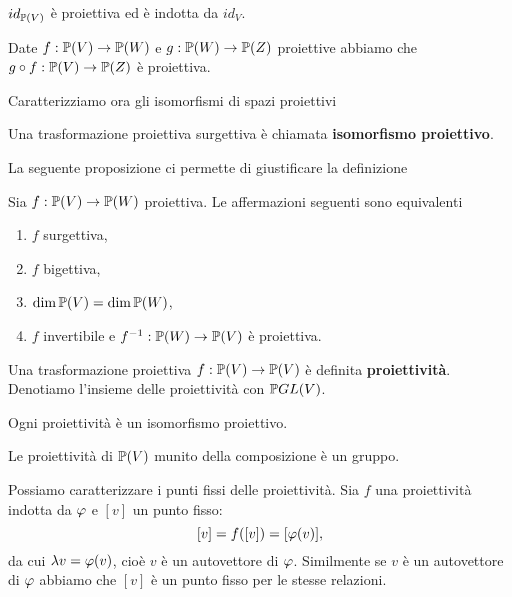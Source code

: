 \begin{multicols*}{2}
    \begin{remark}
        $id_{\mathbb{P}(V)}$ \`e proiettiva ed \`e indotta da $id_V$.
    \end{remark}
    \begin{proposition}
        Date $f:{\mathbb{P}(V)}\to{\mathbb{P}(W)}$ e $g:{\mathbb{P}(W)}\to\mathbb{P}(Z)$ proiettive abbiamo che $g\circ f:{\mathbb{P}(V)}\to\mathbb{P}(Z)$ \`e proiettiva.
    \end{proposition}

    \noindent Caratterizziamo ora gli isomorfismi di spazi proiettivi
    \begin{definition}
    Una trasformazione proiettiva surgettiva \`e chiamata \textbf{isomorfismo proiettivo}.
    \end{definition}
    La seguente proposizione ci permette di giustificare la definizione
    \begin{proposition}
    Sia $f:{\mathbb{P}(V)}\to{\mathbb{P}(W)}$ proiettiva. Le affermazioni seguenti sono equivalenti
    \begin{enumerate}
    \item $f$ surgettiva,
    \item $f$ bigettiva,
    \item $\dim{\mathbb{P}(V)}=\dim{\mathbb{P}(W)}$,
    \item $f$ invertibile e $f^{-1}:{\mathbb{P}(W)}\to{\mathbb{P}(V)}$ \`e proiettiva.
    \end{enumerate}
    \end{proposition}

    \begin{definition}[Proiettivit\`a]
    Una trasformazione proiettiva $f:{\mathbb{P}(V)}\to{\mathbb{P}(V)}$ \`e definita \textbf{proiettivit\`a}. Denotiamo l'insieme delle proiettivit\`a con $\PGL V$.
    \end{definition}
    \begin{remark}
    Ogni proiettivit\`a \`e un isomorfismo proiettivo.
    \end{remark}
    \begin{remark}
    Le proiettivit\`a di ${\mathbb{P}(V)}$ munito della composizione \`e un gruppo.
    \end{remark}

    \begin{remark}\label{PuntiFissiProiettivita}
    Possiamo caratterizzare i punti fissi delle proiettivit\`a. Sia $f$ una proiettivit\`a indotta da $\varphi$ e $[v]$ un punto fisso:
    \[[v]=f([v])=[\varphi(v)],\]
    da cui $\lambda v=\varphi(v)$, cio\`e $v$ \`e un autovettore di $\varphi$. Similmente se $v$ \`e un autovettore di $\varphi$ abbiamo che $[v]$ \`e un punto fisso per le stesse relazioni.
    \end{remark}


\end{multicols*}
